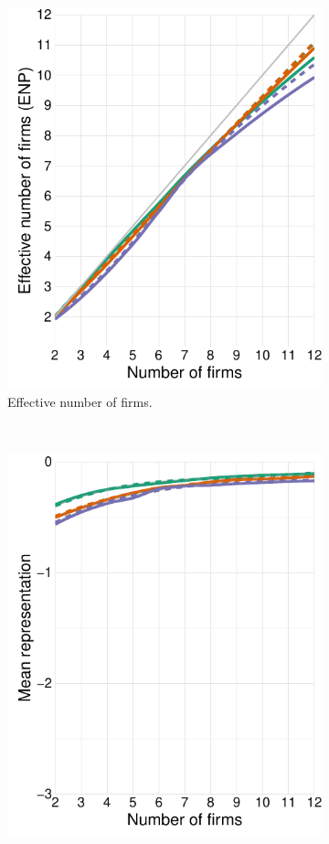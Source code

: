\documentclass[preprint, 12pt]{elsarticle}
\begin{document}
\begin{figure}[ht!]
\begin{subfigure}[t]{0.315\textwidth}
		\includegraphics[width=\textwidth, trim={8mm 0 0 0}]{Graphics/figA22.pdf}
		\caption{Effective number of firms.}
		\label{fig:asys_enp_maxcovrnd}
	\end{subfigure}
	~
	\begin{subfigure}[t]{0.315\textwidth}
		\centering
		\includegraphics[width=\textwidth, trim={8mm 0 0 0}]{Graphics/figA23.pdf}

\end{subfigure}
\end{figure}
\end{document}
